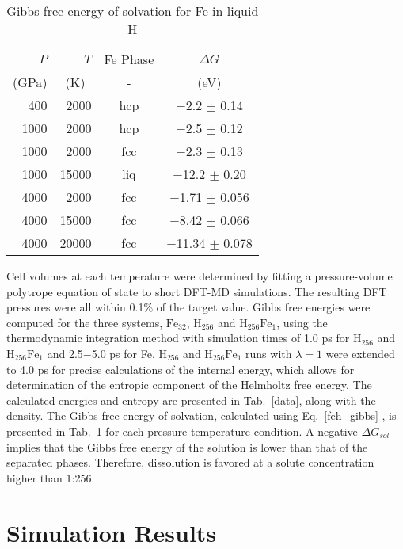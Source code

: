 \begin{table}[h]
    \centering
\caption{Gibbs free energy of solvation for Fe in liquid H\label{solvation}}
\begin{tabular}{rrcc}
    \hline
{$P$} & {$T$} &  {Fe Phase} & {$\Delta G$} \\
(GPa) & (K)~ & - & (eV) \\
\hline
400 \phantom{0}  & 2000  & hcp  &  $-$2.2 $\pm$ 0.14    \\
1000\phantom{0}  & 2000  & hcp  &  $-$2.5 $\pm$ 0.12    \\
1000\phantom{0}  & 2000  & fcc  &  $-$2.3 $\pm$ 0.13    \\
1000\phantom{0}  & 15000 & liq  &  $-$12.2 $\pm$ 0.20\phantom{0}   \\
4000\phantom{0}  & 2000  & fcc  &  $-$1.71 $\pm$ 0.056  \\
4000\phantom{0}  & 15000 & fcc  &  $-$8.42 $\pm$ 0.066  \\
4000\phantom{0} & 20000 & fcc  &  $-$11.34 $\pm$ 0.078\phantom{0} \\
\hline
\end{tabular}
\end{table}


Cell volumes at each temperature were determined by fitting a pressure-volume
polytrope equation of state to short DFT-MD simulations. The resulting DFT
pressures were all within 0.1\% of the target value. Gibbs free energies were
computed for the three systems, $\mathrm{Fe}_{32}$, $\mathrm{H}_{256}$ and
$\mathrm{H}_{256}\mathrm{Fe}_1$, using the thermodynamic integration method
with simulation times of 1.0 ps for $\mathrm{H}_{256}$ and
$\mathrm{H}_{256}\mathrm{Fe}_1$ and 2.5$-$5.0 ps for Fe. $\mathrm{H}_{256}$ and
$\mathrm{H}_{256}\mathrm{Fe}_1$ runs with $\lambda =1$ were extended to 4.0 ps
for precise calculations of the internal energy, which allows for determination
of the entropic component of the Helmholtz free energy. The calculated energies
and entropy are presented in Tab.~\ref{data}, along with the density.  The Gibbs free
energy of solvation, calculated using Eq.~\ref{feh_gibbs} , is presented in Tab.~\ref{solvation} for each
pressure-temperature condition. A negative $\Delta G_{sol}$ implies that the
Gibbs free energy of the solution is lower than that of the separated phases.
Therefore, dissolution is favored at a solute concentration higher than 1:256. 


\section{Simulation Results}

